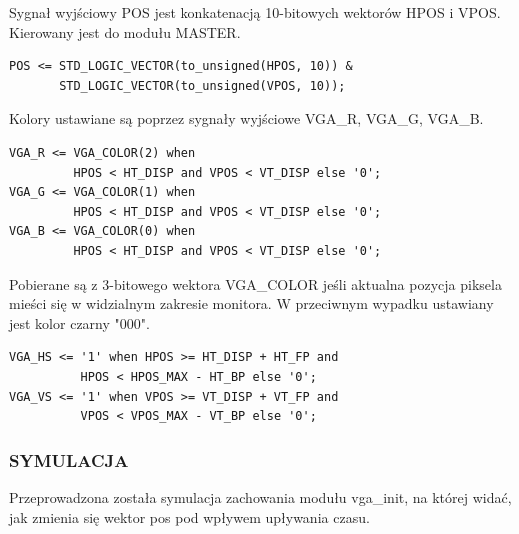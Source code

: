 \documentclass[11pt]{article}
\begin{document}
Sygnał wyjściowy POS jest konkatenacją 10-bitowych wektorów HPOS i VPOS. 
Kierowany jest do modułu MASTER.
\begin{lstlisting}
POS <= STD_LOGIC_VECTOR(to_unsigned(HPOS, 10)) &
       STD_LOGIC_VECTOR(to_unsigned(VPOS, 10));
\end{lstlisting}


Kolory ustawiane są poprzez sygnały wyjściowe VGA\_R, VGA\_G, VGA\_B.
\begin{lstlisting}
VGA_R <= VGA_COLOR(2) when
         HPOS < HT_DISP and VPOS < VT_DISP else '0';
VGA_G <= VGA_COLOR(1) when
         HPOS < HT_DISP and VPOS < VT_DISP else '0';
VGA_B <= VGA_COLOR(0) when
         HPOS < HT_DISP and VPOS < VT_DISP else '0';
\end{lstlisting}
Pobierane są z 3-bitowego wektora VGA\_COLOR jeśli aktualna pozycja piksela mieści się w widzialnym zakresie monitora.
W przeciwnym wypadku ustawiany jest kolor czarny "000".
\begin{lstlisting}
VGA_HS <= '1' when HPOS >= HT_DISP + HT_FP and
          HPOS < HPOS_MAX - HT_BP else '0';
VGA_VS <= '1' when VPOS >= VT_DISP + VT_FP and
          VPOS < VPOS_MAX - VT_BP else '0';
\end{lstlisting}

\subsubsection{SYMULACJA}

Przeprowadzona została symulacja zachowania modułu vga\_init, na której widać, jak zmienia się wektor pos pod wpływem upływania czasu.
\end{document}
